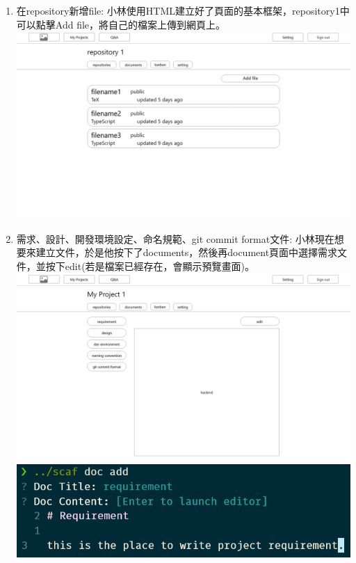 \documentclass{report}
\begin{document}
\begin{enumerate}[label=(\Alph*)]
  \item 在repository新增file: 小林使用HTML建立好了頁面的基本框架，repository1中可以點擊Add file，將自己的檔案上傳到網頁上。\\
  \includegraphics[width=\textwidth]{assets/wireframe/My_projects_add_file.png }
  \item 需求、設計、開發環境設定、命名規範、git commit format文件: 小林現在想要來建立文件，於是他按下了documents，然後再document頁面中選擇需求文件，並按下edit(若是檔案已經存在，會顯示預覽畫面)。\\
  \includegraphics[width=\textwidth]{assets/wireframe/My_Projects_documents_requirement_dev_environment_naming_convention_git commit format.png }
  \includegraphics[width=\textwidth]{assets/wireframe/My_Projects_documents_requirement_dev_environment_naming_convention_git commit format_CLI.png }

\end{enumerate}
\end{document}
